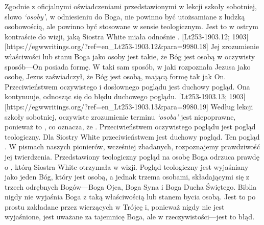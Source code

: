 Zgodnie z oficjalnymi oświadczeniami przedstawionymi w lekcji szkoły sobotniej, słowo \textit{‘osoby’},\textit{ }w odniesieniu do Boga, nie powinno być utożsamiane z ludzką osobowością, ale powinno być stosowane w sensie teologicznym. Jest to w ostrym kontraście do wizji, jaką Siostra White miała odnośnie . [Lt253-1903.12; 1903][https://egwwritings.org/?ref=en\_Lt253-1903.12&para=9980.18] Jej zrozumienie właściwości lub stanu Boga jako osoby jest takie, że Bóg jest osobą w oczywisty sposób—On posiada formę. W taki sam sposób, w jaki rozpoznała Jezusa jako osobę, Jezus zaświadczył, że Bóg jest osobą, mającą formę tak jak On. Przeciwieństwem oczywistego i dosłownego poglądu jest duchowy pogląd. Ona kontynuuje, odnosząc się do błędu duchowego poglądu. [Lt253-1903.13; 1903][https://egwwritings.org/?ref=en\_Lt253-1903.13&para=9980.19] Według lekcji szkoły sobotniej, oczywiste zrozumienie terminu \textit{‘osoba’ }jest niepoprawne, ponieważ to , co oznacza, że . Przeciwieństwem oczywistego poglądu jest pogląd teologiczny. Dla Siostry White przeciwieństwem jest duchowy pogląd. Ten pogląd . W pismach naszych pionierów, wcześniej zbadanych, rozpoznajemy prawdziwość jej twierdzenia. Przedstawiony teologiczny pogląd na osobę Boga odrzuca prawdę o , którą Siostra White otrzymała w wizji. Pogląd teologiczny jest wyjaśniany jako jeden Bóg, który jest osobą, a jednak trzema osobami, składającymi się z trzech odrębnych Bogów—Boga Ojca, Boga Syna i Boga Ducha Świętego. Biblia nigdy nie wyjaśnia Boga z taką właściwością lub stanem bycia osobą. Jest to po prostu zakładane przez wierzących w Trójcę i, ponieważ nigdy nie jest wyjaśnione, jest uważane za tajemnicę Boga, ale w rzeczywistości—jest to błąd.


